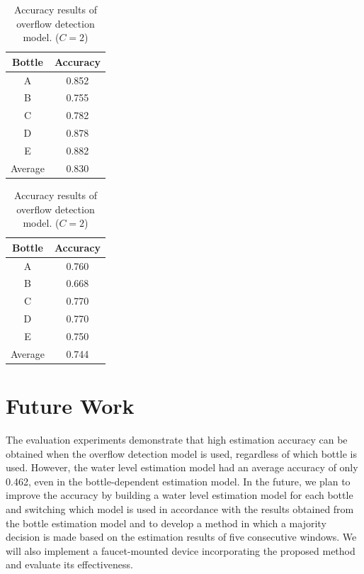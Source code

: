 \documentclass[manuscript,screen,anonymous,review]{acmart}
\begin{document}
\begin{table}[!t]
  \centering
  \caption{Accuracy results of overflow detection model. ($C=2$)}
  \begin{minipage}[t]{0.45\linewidth}
    \centering
    \begin{tabular}{c|c} \hline\hline
    Bottle & Accuracy \\ \hline
    A & 0.852 \\
    B & 0.755 \\
    C & 0.782 \\
    D & 0.878 \\
    E & 0.882 \\ \hline
    Average & 0.830 \\ \hline
    \end{tabular}
    \label{tab:result_2_dependent}
  \end{minipage}
  \begin{minipage}[t]{0.45\linewidth}
    \centering
    \begin{tabular}{c|c} \hline\hline
    Bottle & Accuracy \\ \hline
    A & 0.760 \\
    B & 0.668 \\
    C & 0.770 \\
    D & 0.770 \\
    E & 0.750 \\ \hline
    Average & 0.744 \\ \hline
    \end{tabular}
    \label{tab:result_2_independent}
  \end{minipage}
  \label{tab:result_2}
\end{table}



\section{Future Work}
\label{sec:future_work}
The evaluation experiments demonstrate that high estimation accuracy can be obtained when the overflow detection model is used, regardless of which bottle is used. However, the water level estimation model had an average accuracy of only 0.462, even in the bottle-dependent estimation model. In the future, we plan to improve the accuracy by building a water level estimation model for each bottle and switching which model is used in accordance with the results obtained from the bottle estimation model and to develop a method in which a majority decision is made based on the estimation results of five consecutive windows. We will also implement a faucet-mounted device incorporating the proposed method and evaluate its effectiveness.
\end{document}
